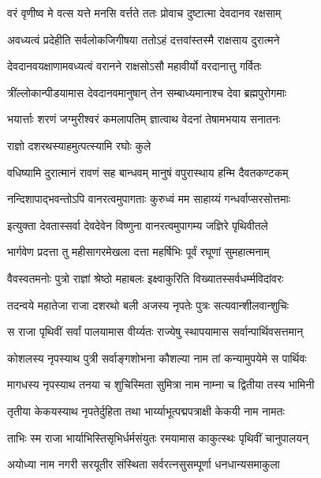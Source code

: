 \twolineshloka
{वरं वृणीष्व मे वत्स यत्ते मनसि वर्त्तते}
{ततः प्रोवाच दुष्टात्मा देवदानव रक्षसाम्}%

\twolineshloka
{अवध्यत्वं प्रदेहीति सर्वलोकजिगीषया}
{ततोऽहं दत्तवांस्तस्मै राक्षसाय दुरात्मने}%

\twolineshloka
{देवदानवयक्षाणामवध्यत्वं वरानने}
{राक्षसोऽसौ महावीर्यो वरदानात्तु गर्वितः}%

\twolineshloka
{त्रींल्लोकान्पीडयामास देवदानवमानुषान्}
{तेन सम्बाध्यमानाश्च देवा ब्रह्मपुरोगमाः}%

\twolineshloka
{भयार्त्ताः शरणं जग्मुरीश्वरं कमलापतिम्}
{ज्ञात्वाथ वेदनां तेषामभयाय सनातनः}%


\onelineshloka
{राज्ञो दशरथस्याहमुत्पत्स्यामि रघोः कुले}%

\twolineshloka
{वधिष्यामि दुरात्मानं रावणं सह बान्धवम्}
{मानुषं वपुरास्थाय हन्मि दैवतकण्टकम्}%

\twolineshloka
{नन्दिशापाद्भवन्तोऽपि वानरत्वमुपागताः}
{कुरुध्वं मम साहाय्यं गन्धर्वाप्सरसोत्तमाः}%


\twolineshloka
{इत्युक्ता देवतास्सर्वा देवदेवेन विष्णुना}
{वानरत्वमुपागम्य जज्ञिरे पृथिवीतले}%

\twolineshloka
{भार्गवेण प्रदत्ता तु महीसागरमेखला}
{दत्ता महर्षिभिः पूर्वं रघूणां सुमहात्मनाम्}%

\twolineshloka
{वैवस्वतमनोः पुत्रो राज्ञां श्रेष्ठो महाबलः}
{इक्ष्वाकुरिति विख्यातस्सर्वधर्म्मविदांवरः}%

\twolineshloka
{तदन्वये महातेजा राजा दशरथो बली}
{अजस्य नृपतेः पुत्रः सत्यवान्शीलवान्शुचिः}%

\twolineshloka
{स राजा पृथिवीं सर्वां पालयामास वीर्य्यतः}
{राज्येषु स्थापयामास सर्वान्पार्थिवसत्तमान्}%

\twolineshloka
{कोशलस्य नृपस्याथ पुत्री सर्वाङ्गशोभना}
{कौशल्या नाम तां कन्यामुपयेमे स पार्थिवः}%

\twolineshloka
{मागधस्य नृपस्याथ तनया च शुचिस्मिता}
{सुमित्रा नाम नाम्ना च द्वितीया तस्य भामिनी}%

\twolineshloka
{तृतीया केकयस्याथ नृपतेर्दुहिता तथा}
{भार्य्याभूत्पद्मपत्राक्षी केकयी नाम नामतः}%

\twolineshloka
{ताभिः स्म राजा भार्याभिस्तिसृभिर्धर्मसंयुतः}
{रमयामास काकुत्स्थः पृथिवीं चानुपालयन्}%

\twolineshloka
{अयोध्या नाम नगरी सरयूतीर संस्थिता}
{सर्वरत्नसुसम्पूर्णा धनधान्यसमाकुला}%

